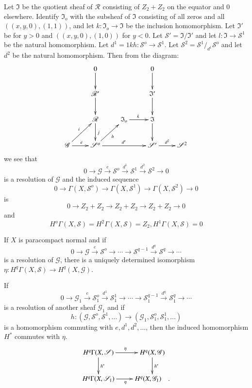  Let $\mathfrak{I}$ be the quotient  sheaf of $\mathscr{R}$
  consisting of $Z_2 +Z_2$ on the equator and 0 elsewhere. Identify
  $\mathfrak{I}_o$ with the subsheaf of $\mathfrak{I}$ consisting  of
  all zeros and all $((x,y,0), (1,1))$, and let $k :\mathfrak{I}_o \to
  \mathfrak{I}$ be the inclusion homomorphism. Let $\mathfrak{I}'$ be
  for $y > 0$ and $((x,y,0),(1,0))$ for $y < 0$. Let $\mathscr{S}'=
  \mathfrak{I}/\mathfrak{I}'$ and let $l:  \mathfrak{I} \to
  \mathscr{S}^1$ be the natural homomorphism. Let $d^1 = 1 kh:
  \mathscr{S}^o \to \mathscr{S}^1$. Let $\mathscr{S}^2=  \mathscr{S}^1
  / _{d^1} \mathscr{S}^o$ and let $d^2$ be the natural
  homomorphism. Then from the diagram: 
\[
\xymatrix{
& 0\ar[d] & & 0\ar[d] & \\
& \mathscr{R}' \ar[d] & & \mathfrak{I}'\ar[d] & \\
& \mathscr{R}\ar[d]^{j} & \mathfrak{I}_o \ar[r]^k & \mathfrak{I} \ar[d]& \\
\mathscr{G} \ar[ur]^{i} \ar[r]^e & \mathscr{S}^o \ar[ur]_h \ar[rr]^{d'}
& &  \mathscr{S}' \ar[r]^{d^2} & \mathscr{S}^2
}
\]
  we see that 
  $$
  0 \to \mathscr{G} \xrightarrow{e} \mathscr{S}^o \xrightarrow{d^1}
  \mathscr{S}^1 \xrightarrow{d^2} \mathscr{S}^2 \to 0 
  $$ 
  is a resolution of $\mathscr{G}$ and the induced sequence 
  $$
  0 \to \Gamma(X, \mathscr{S}^o) \to \Gamma(X,\mathscr{S}^1) \to
  \Gamma(X,\mathscr{S}^2) \to 0 
  $$
  is\pageoriginale 
  $$
  0 \to  Z_2 + Z_2 \to  Z_2 +Z_2 \to Z_2 + Z_2 \to 0 
  $$
  and 
  $$
  H^o \Gamma(X, \mathscr{S}) = H^2 \Gamma (X,\mathscr{S}) = Z_2, H^1
  \Gamma(X, \mathscr{S}) =0 
  $$
  
  \begin{proposition}\label{chap14:prop10}%
If $X$ is paracompact normal and if
$$
0 \to \mathscr{G} \xrightarrow{e} \mathscr{S}^o \to \cdots \to
\mathscr{S}^{q-1} \xrightarrow{d^q} \mathscr{S}^q \to \cdots 
$$
is a resolution of $\mathscr{G}$, there is a uniquely determined
  isomorphism $\eta:H^q \Gamma (X, \mathscr{S}) \to H^q (X,
  \mathscr{G})$. 

If
  $$ 
  0 \to  \mathscr{G}_1 \xrightarrow{e} \mathscr{S}^o_1
  \xrightarrow{d^1} \mathscr{S}^1_1 \to \cdots \to \mathscr{S}^{q-1}_1
  \xrightarrow{d^q} \mathscr{S}^q_1 \to \cdots 
  $$
is a resolution of another sheaf $\mathscr{G}_1$ and if
  $$
  h:(\mathscr{G}, \mathscr{S}^o,\mathscr{S}^1, \ldots)  \to
  (\mathscr{G}_1, \mathscr{S}^o_1, \mathscr{S}^1_1, \ldots) 
  $$
is a homomorphism commuting with $e,d^1,d^2, \ldots $,
then the induced homomorphism $H^*$ commutes with
  $\eta$. 
\[
\xymatrix{
H^q\Gamma(X,\mathscr{S}) \ar[r]^{\eta}\ar[d]^{h^{\ast}} &
H^q(X,\mathscr{G})\ar[d]^{h^{\ast}} \\
H^q\Gamma (X,\mathscr{S}_1) \ar[r]_{\eta} & H^q(X,\mathscr{G}_1) \quad .
}
\]
 \end{proposition}

